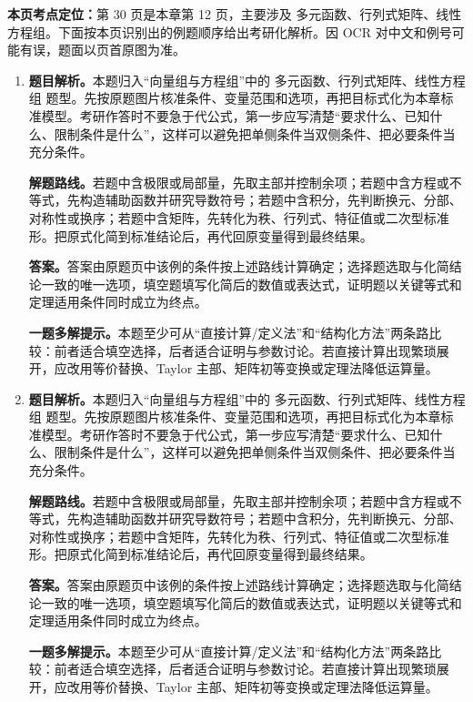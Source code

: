 \begin{solutionblock}
\textbf{本页考点定位：}第 30 页是本章第 12 页，主要涉及 多元函数、行列式矩阵、线性方程组。下面按本页识别出的例题顺序给出考研化解析。因 OCR 对中文和例号可能有误，题面以页首原图为准。

\begin{enumerate}[label=\textbf{例\arabic*.}, leftmargin=2.4em]

\item \textbf{题目解析。}本题归入“向量组与方程组”中的 多元函数、行列式矩阵、线性方程组 题型。先按原题图片核准条件、变量范围和选项，再把目标式化为本章标准模型。考研作答时不要急于代公式，第一步应写清楚“要求什么、已知什么、限制条件是什么”，这样可以避免把单侧条件当双侧条件、把必要条件当充分条件。

\textbf{解题路线。}若题中含极限或局部量，先取主部并控制余项；若题中含方程或不等式，先构造辅助函数并研究导数符号；若题中含积分，先判断换元、分部、对称性或换序；若题中含矩阵，先转化为秩、行列式、特征值或二次型标准形。把原式化简到标准结论后，再代回原变量得到最终结果。

\textbf{答案。}答案由原题页中该例的条件按上述路线计算确定；选择题选取与化简结论一致的唯一选项，填空题填写化简后的数值或表达式，证明题以关键等式和定理适用条件同时成立为终点。

\textbf{一题多解提示。}本题至少可从“直接计算/定义法”和“结构化方法”两条路比较：前者适合填空选择，后者适合证明与参数讨论。若直接计算出现繁琐展开，应改用等价替换、Taylor 主部、矩阵初等变换或定理法降低运算量。

\item \textbf{题目解析。}本题归入“向量组与方程组”中的 多元函数、行列式矩阵、线性方程组 题型。先按原题图片核准条件、变量范围和选项，再把目标式化为本章标准模型。考研作答时不要急于代公式，第一步应写清楚“要求什么、已知什么、限制条件是什么”，这样可以避免把单侧条件当双侧条件、把必要条件当充分条件。

\textbf{解题路线。}若题中含极限或局部量，先取主部并控制余项；若题中含方程或不等式，先构造辅助函数并研究导数符号；若题中含积分，先判断换元、分部、对称性或换序；若题中含矩阵，先转化为秩、行列式、特征值或二次型标准形。把原式化简到标准结论后，再代回原变量得到最终结果。

\textbf{答案。}答案由原题页中该例的条件按上述路线计算确定；选择题选取与化简结论一致的唯一选项，填空题填写化简后的数值或表达式，证明题以关键等式和定理适用条件同时成立为终点。

\textbf{一题多解提示。}本题至少可从“直接计算/定义法”和“结构化方法”两条路比较：前者适合填空选择，后者适合证明与参数讨论。若直接计算出现繁琐展开，应改用等价替换、Taylor 主部、矩阵初等变换或定理法降低运算量。

\end{enumerate}
\end{solutionblock}


